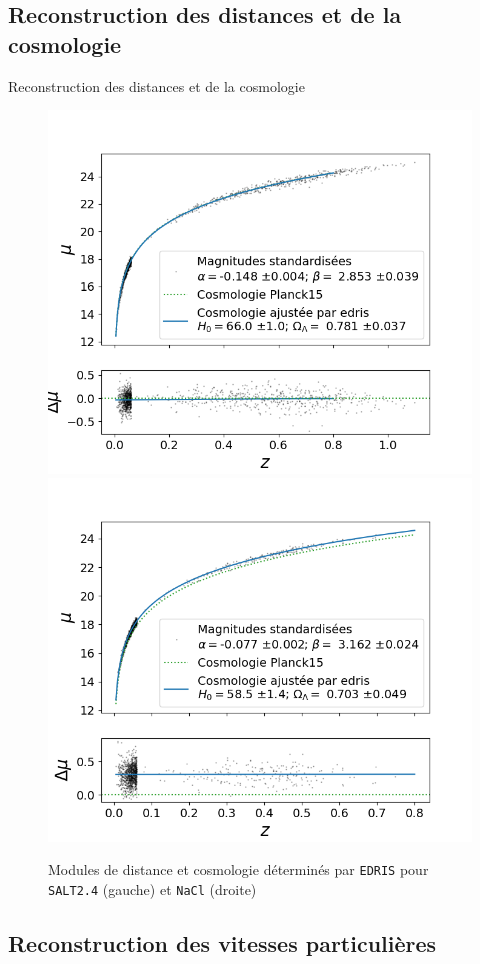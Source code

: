 \documentclass{beamer}
\begin{document}
\subsection{Reconstruction des distances et de la cosmologie}

\begin{frame}{Reconstruction des distances et de la cosmologie}
\begin{figure}
	\centering
	\includegraphics[width=.48\textwidth]{figures/salt_cosmo.png}
	\includegraphics[width=.48\textwidth]{figures/nacl_cosmo.png}
	\caption{Modules de distance et cosmologie déterminés par \texttt{EDRIS} pour \texttt{SALT2.4} (gauche) et \texttt{NaCl} (droite)}
\end{figure}
\end{frame}

\subsection{Reconstruction des vitesses particulières}

\end{document}
